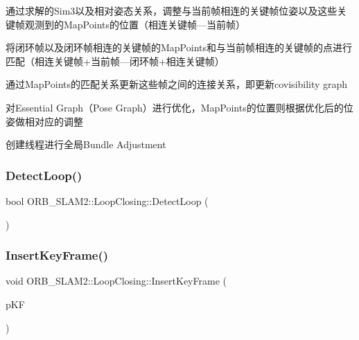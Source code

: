 \begin{DoxyEnumerate}
\item 通过求解的\+Sim3以及相对姿态关系，调整与当前帧相连的关键帧位姿以及这些关键帧观测到的\+Map\+Points的位置（相连关键帧---当前帧）
\item 将闭环帧以及闭环帧相连的关键帧的\+Map\+Points和与当前帧相连的关键帧的点进行匹配（相连关键帧+当前帧---闭环帧+相连关键帧）
\item 通过\+Map\+Points的匹配关系更新这些帧之间的连接关系，即更新covisibility graph
\item 对\+Essential Graph（\+Pose Graph）进行优化，\+Map\+Points的位置则根据优化后的位姿做相对应的调整
\item 创建线程进行全局\+Bundle Adjustment 
\end{DoxyEnumerate}\mbox{\label{class_o_r_b___s_l_a_m2_1_1_loop_closing_aa8110ca79cebaf509e378d30e55f1381}} 
\subsubsection{\texorpdfstring{Detect\+Loop()}{DetectLoop()}}
{\footnotesize\ttfamily bool O\+R\+B\+\_\+\+S\+L\+A\+M2\+::\+Loop\+Closing\+::\+Detect\+Loop (\begin{DoxyParamCaption}{ }\end{DoxyParamCaption})\hspace{0.3cm}{\ttfamily [protected]}}

\mbox{\label{class_o_r_b___s_l_a_m2_1_1_loop_closing_a680d0b255d764754841e622f5af97473}} 
\subsubsection{\texorpdfstring{Insert\+Key\+Frame()}{InsertKeyFrame()}}
{\footnotesize\ttfamily void O\+R\+B\+\_\+\+S\+L\+A\+M2\+::\+Loop\+Closing\+::\+Insert\+Key\+Frame (\begin{DoxyParamCaption}\item[{\mbox{\hyperlink{class_o_r_b___s_l_a_m2_1_1_key_frame}{Key\+Frame}} $\ast$}]{p\+KF }\end{DoxyParamCaption})}

